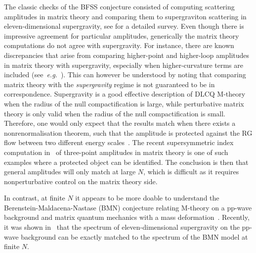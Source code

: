 \documentclass[11pt]{article}
\renewcommand{\emph}[1]{\textit{#1}}
\begin{document}
The classic checks of the BFSS conjecture consisted of computing scattering amplitudes in matrix theory and comparing them to supergraviton scattering in eleven-dimensional supergravity, see \cite{Taylor:2001vb} for a detailed survey.  
Even though there is impressive agreement for particular amplitudes, generically the matrix theory computations do not agree with supergravity. For instance, there are known discrepancies that arise from comparing higher-point and higher-loop amplitudes in matrix theory with supergravity, especially when higher-curvature terms are included (see~\emph{e.g.}~\cite{Helling:1999js}).
This can however be understood by noting that comparing matrix theory with the \emph{supergravity} regime is not guaranteed to be in correspondence.
Supergravity is a good effective description of DLCQ M-theory when the radius of the null compactification is large, while perturbative matrix theory is only valid when the radius of the null compactification is small. Therefore, one would only expect that the results match when there exists a nonrenormalisation theorem, such that the amplitude is protected against the RG flow between two different energy scales~\cite{Helling:1999js}. The recent supersymmetric index computation in~\cite{Herderschee:2023bnc} of three-point amplitudes in matrix theory is one of such examples where a protected object can be identified. The conclusion is then that general amplitudes will only match at large $N$, which is difficult as it requires nonperturbative control on the matrix theory side. 

In contrast, at finite $N$ it appears to be more doable to understand the Berenstein-Maldacena-Nastase (BMN) conjecture relating M-theory on a pp-wave background and matrix quantum mechanics with a mass deformation~\cite{Berenstein:2002jq}. Recently, it was shown in~\cite{Komatsu:2024vnb} that the spectrum of eleven-dimensional supergravity on the pp-wave background can be exactly matched to the spectrum of the BMN model at finite $N$. 
\end{document}
